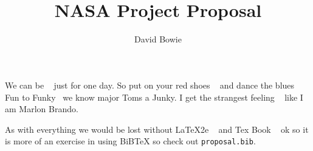 \documentclass[12pt,twoside]{article}
\title{\textbf{\doctitle}\\
NASA Project Proposal}
\author{David Bowie}
\begin{document}
\thispagestyle{empty}

\maketitle

We can be ~\cite{Heroes,Changes} just for one day.
So put on your red shoes ~\cite{Dance} and dance the blues
Fun to Funky~\cite{Ashes} we know major Toms a Junky.
I get the strangest feeling ~\cite{China} like I am Marlon Brando.

As with everything we would be lost without LaTeX2e ~\cite{LaTeX2e} and Tex Book ~\cite{TeX-book} ok so it is more of an exercise in using BiBTeX so check out \texttt{proposal.bib}.

\end{document}
